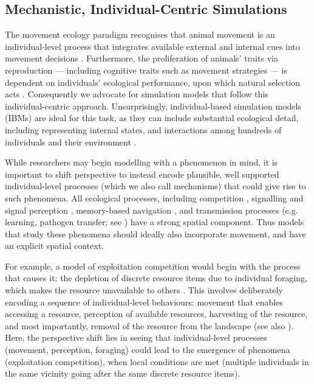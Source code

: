 \subsection*{Mechanistic, Individual-Centric Simulations}

The movement ecology paradigm recognises that animal movement is an individual-level process that integrates available external and internal cues into movement decisions \parencite{nathan2008a,holyoak2008}.
Furthermore, the proliferation of animals' traits via reproduction --- including cognitive traits such as movement strategies --- is dependent on individuals' ecological performance, upon which natural selection acts \parencite{hofbauer1988}.
Consequently we advocate for simulation models that follow this individual-centric approach.
Unsurprisingly, individual-based simulation models (IBMs) are ideal for this task, as they can include substantial ecological detail, including representing internal states, and interactions among hundreds of individuals and their environment \parencite{huston1988,deangelis2005,deangelis2018,deangelis2019}.

While researchers may begin modelling with a phenomenon in mind, it is important to shift perspective to instead encode plausible, well supported individual-level processes (which we also call mechanisms) that could give rise to such phenomena.
All ecological processes, including competition \parencite{keddy2001}, signalling and signal perception \parencite{torney2011}, memory-based navigation \parencite{bracis2017,robira2021}, and transmission processes (e.g. learning, pathogen transfer; see \cite{cantor2021,romano2021}) have a strong spatial component.
Thus models that study these phenomena should ideally also incorporate movement, and have an explicit spatial context.

For example, a model of exploitation competition would begin with the process that causes it: the depletion of discrete resource items due to individual foraging, which makes the resource unavailable to others \parencite[][; see Fig.~\ref{fig:intro_concepts}A]{keddy2001}.
This involves deliberately encoding a sequence of individual-level behaviours: movement that enables accessing a resource, perception of available resources, harvesting of the resource, and most importantly, removal of the resource from the landscape (see also \cite{spiegel2017,gupte2021a,gupte2022c}).
Here, the perspective shift lies in seeing that individual-level processes (movement, perception, foraging) could lead to the emergence of phenomena (exploitation competition), when local conditions are met (multiple individuals in the same vicinity going after the same discrete resource items).

